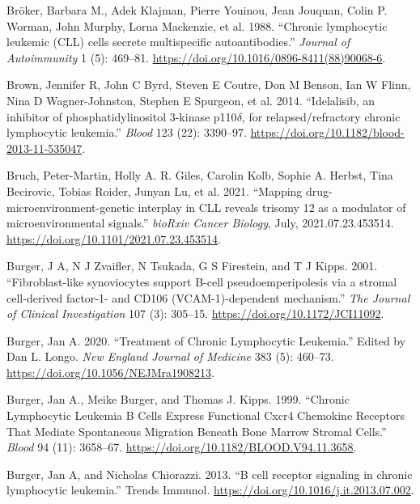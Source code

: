 \documentclass[11pt, a4paper, twosided]{book}
\newenvironment{CSLReferences}%
  {}%
  {\par}
\begin{document}
\begin{CSLReferences}{1}{0}
\leavevmode{}%
Bröker, Barbara M., Adek Klajman, Pierre Youinou, Jean Jouquan, Colin P. Worman, John Murphy, Lorna Mackenzie, et al. 1988. {``{Chronic lymphocytic leukemic (CLL) cells secrete multispecific autoantibodies}.''} \emph{Journal of Autoimmunity} 1 (5): 469--81. \url{https://doi.org/10.1016/0896-8411(88)90068-6}.

\leavevmode{}%
Brown, Jennifer R, John C Byrd, Steven E Coutre, Don M Benson, Ian W Flinn, Nina D Wagner-Johnston, Stephen E Spurgeon, et al. 2014. {``{Idelalisib, an inhibitor of phosphatidylinositol 3-kinase p110\(\delta\), for relapsed/refractory chronic lymphocytic leukemia}.''} \emph{Blood} 123 (22): 3390--97. \url{https://doi.org/10.1182/blood-2013-11-535047}.

\leavevmode{}%
Bruch, Peter-Martin, Holly A. R. Giles, Carolin Kolb, Sophie A. Herbst, Tina Becirovic, Tobias Roider, Junyan Lu, et al. 2021. {``{Mapping drug-microenvironment-genetic interplay in CLL reveals trisomy 12 as a modulator of microenvironmental signals}.''} \emph{bioRxiv Cancer Biology}, July, 2021.07.23.453514. \url{https://doi.org/10.1101/2021.07.23.453514}.

\leavevmode{}%
Burger, J A, N J Zvaifler, N Tsukada, G S Firestein, and T J Kipps. 2001. {``{Fibroblast-like synoviocytes support B-cell pseudoemperipolesis via a stromal cell-derived factor-1- and CD106 (VCAM-1)-dependent mechanism.}''} \emph{The Journal of Clinical Investigation} 107 (3): 305--15. \url{https://doi.org/10.1172/JCI11092}.

\leavevmode{}%
Burger, Jan A. 2020. {``{Treatment of Chronic Lymphocytic Leukemia}.''} Edited by Dan L. Longo. \emph{New England Journal of Medicine} 383 (5): 460--73. \url{https://doi.org/10.1056/NEJMra1908213}.

\leavevmode{}%
Burger, Jan A., Meike Burger, and Thomas J. Kipps. 1999. {``{Chronic Lymphocytic Leukemia B Cells Express Functional Cxcr4 Chemokine Receptors That Mediate Spontaneous Migration Beneath Bone Marrow Stromal Cells}.''} \emph{Blood} 94 (11): 3658--67. \url{https://doi.org/10.1182/BLOOD.V94.11.3658}.

\leavevmode{}%
Burger, Jan A, and Nicholas Chiorazzi. 2013. {``{B cell receptor signaling in chronic lymphocytic leukemia}.''} Trends Immunol. \url{https://doi.org/10.1016/j.it.2013.07.002}.


\end{CSLReferences}
\end{document}

